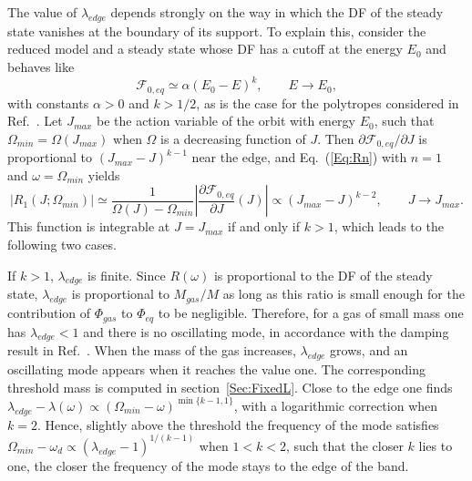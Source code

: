 The value of $\lambda_{edge}$ depends strongly on the way in which the DF of the steady state vanishes at the boundary of its support. To explain this, consider the reduced model and a steady state whose DF has a cutoff at the energy $E_0$ and behaves like
\begin{equation}
\mathcal{F}_{0,eq}\simeq \alpha (E_0 - E)^k,\qquad E\to E_0,
\label{Eq:PolytropeEdge}
\end{equation}
with constants $\alpha > 0$ and $k > 1/2$, as is the case for the polytropes considered in Ref.~\cite{mHgRmScS25}. Let $J_{max}$ be the action variable of the orbit with energy $E_0$, such that $\Omega_{min} = \Omega(J_{max})$ when $\Omega$ is a decreasing function of $J$. Then $\partial\mathcal{F}_{0,eq}/\partial J$ is proportional to $(J_{max} - J)^{k-1}$ near the edge, and Eq.~(\ref{Eq:Rn}) with $n = 1$ and $\omega = \Omega_{min}$ yields
\begin{equation}
|R_1(J;\Omega_{min})|\simeq \frac{1}{\Omega(J) - \Omega_{min}}\left| \frac{\partial\mathcal{F}_{0,eq}}{\partial J}(J) \right| \propto (J_{max} - J)^{k-2},\qquad J\to J_{max}.
\label{Eq:R1Edge}
\end{equation}
This function is integrable at $J = J_{max}$ if and only if $k > 1$, which leads to the following two cases.

If $k > 1$, $\lambda_{edge}$ is finite. Since $R(\omega)$ is proportional to the DF of the steady state, $\lambda_{edge}$ is proportional to $M_{gas}/M$ as long as this ratio is small enough for the contribution of $\Phi_{gas}$ to $\Phi_{eq}$ to be negligible. Therefore, for a gas of small mass one has $\lambda_{edge} < 1$ and there is no oscillating mode, in accordance with the damping result in Ref.~\cite{mHgRmScS25}. When the mass of the gas increases, $\lambda_{edge}$ grows, and an oscillating mode appears when it reaches the value one. The corresponding threshold mass is computed in section~\ref{Sec:FixedL}. Close to the edge one finds $\lambda_{edge} - \lambda(\omega)\propto (\Omega_{min} - \omega)^{\min\{ k-1,1 \}}$, with a logarithmic correction when $k = 2$. Hence, slightly above the threshold the frequency of the mode satisfies $\Omega_{min} - \omega_d\propto (\lambda_{edge} - 1)^{1/(k-1)}$ when $1 < k < 2$, such that the closer $k$ lies to one, the closer the frequency of the mode stays to the edge of the band.

